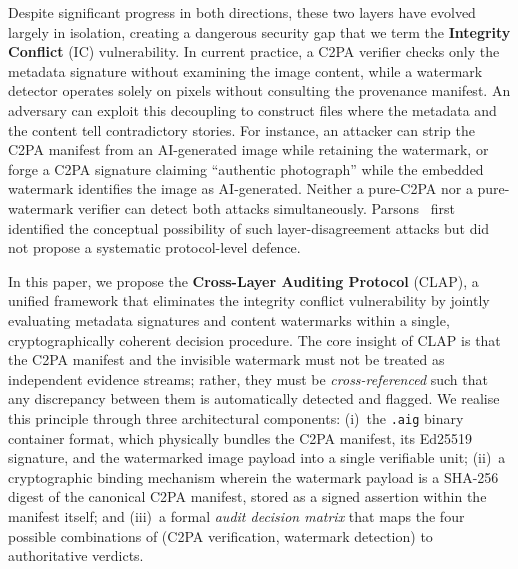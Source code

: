 \documentclass[conference]{IEEEtran}
\begin{document}
Despite significant progress in both directions, these two layers have
evolved largely in isolation, creating a dangerous security gap that we
term the \textbf{Integrity Conflict} (IC) vulnerability.
In current practice, a C2PA verifier checks only the metadata signature
without examining the image content, while a watermark detector operates
solely on pixels without consulting the provenance manifest.
An adversary can exploit this decoupling to construct files where the
metadata and the content tell contradictory stories.
For instance, an attacker can strip the C2PA manifest from an
AI-generated image while retaining the watermark, or forge a C2PA
signature claiming ``authentic photograph'' while the embedded watermark
identifies the image as AI-generated.
Neither a pure-C2PA nor a pure-watermark verifier can detect both attacks
simultaneously.
Parsons~\cite{parsons2023integrity} first identified the conceptual
possibility of such layer-disagreement attacks but did not propose a
systematic protocol-level defence.

In this paper, we propose the \textbf{Cross-Layer Auditing Protocol}
(CLAP), a unified framework that eliminates the integrity conflict
vulnerability by jointly evaluating metadata signatures and content
watermarks within a single, cryptographically coherent decision procedure.
The core insight of CLAP is that the C2PA manifest and the invisible
watermark must not be treated as independent evidence streams; rather,
they must be \textit{cross-referenced} such that any discrepancy between
them is automatically detected and flagged.
We realise this principle through three architectural components:
(i)~the \texttt{.aig} binary container format, which physically bundles
the C2PA manifest, its Ed25519 signature, and the watermarked image
payload into a single verifiable unit;
(ii)~a cryptographic binding mechanism wherein the watermark payload is
a SHA-256 digest of the canonical C2PA manifest, stored as a signed
assertion within the manifest itself; and
(iii)~a formal \textit{audit decision matrix} that maps the four possible
combinations of (C2PA verification, watermark detection) to authoritative
verdicts.
\end{document}
